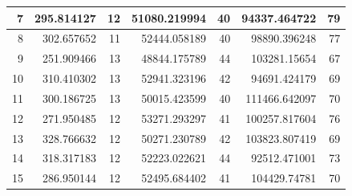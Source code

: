 \begin{table}
\begin{adjustwidth}{}{}
{{\begin{tabular}{|r|r|r|r|r|r|r|}
					\hline
					7                                          & 295.814127                   & 12                                    & 51080.219994                   & 40                                    & 94337.464722                 & 79                                     \\ 
					\hline
					8                                          & 302.657652                   & 11                                    & 52444.058189                   & 40                                    & 98890.396248                 & 77                                     \\ 
					\hline
					9                                          & 251.909466                   & 13                                    & 48844.175789                   & 44                                    & 103281.15654                 & 67                                     \\ 
					\hline
					10                                         & 310.410302                   & 13                                    & 52941.323196                   & 42                                    & 94691.424179                 & 69                                     \\ 
					\hline
					11                                         & 300.186725                   & 13                                    & 50015.423599                   & 40                                    & 111466.642097                & 70                                     \\ 
					\hline
					12                                         & 271.950485                   & 12                                    & 53271.293297                   & 41                                    & 100257.817604                & 76                                     \\ 
					\hline
					13                                         & 328.766632                   & 12                                    & 50271.230789                   & 42                                    & 103823.807419                & 69                                     \\ 
					\hline
					14                                         & 318.317183                   & 12                                    & 52223.022621                   & 44                                    & 92512.471001                 & 73                                     \\ 
					\hline
					15                                         & 286.950144                   & 12                                    & 52495.684402                   & 41                                    & 104429.74781                 & 70                                     \\ 

\end{tabular}}}
\end{adjustwidth}
\end{table}

